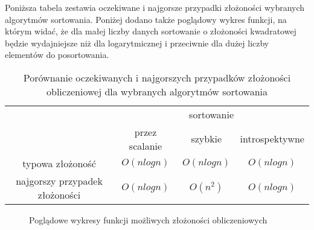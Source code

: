 Poniższa tabela zestawia oczekiwane i najgorsze przypadki złożoności wybranych algorytmów sortowania. Poniżej dodano także poglądowy wykres funkcji, na którym widać, że dla małej liczby danych sortowanie o złożoności kwadratowej będzie wydajniejsze niż dla logarytmicznej i przeciwnie dla dużej liczby elementów do posortowania.

\begin{table}[H]
    \centering
    \caption{Porównanie oczekiwanych i najgorszych przypadków złożoności obliczeniowej dla wybranych algorytmów sortowania}
    \label{tab: opis_zlozonosc}
    \begin{tabular}{c|ccc|}
        \cline{2-4}
        & \multicolumn{3}{c|}{sortowanie}   \\ \cline{2-4} & \multicolumn{1}{c|}{przez scalanie} & \multicolumn{1}{c|}{szybkie} & introspektywne \\ \hline
        \multicolumn{1}{|c|}{typowa złożoność} & \multicolumn{1}{c|}{$O(nlogn)$} & \multicolumn{1}{c|}{$O(nlogn)$} & $O(nlogn)$       \\ \hline
        \multicolumn{1}{|c|}{najgorszy przypadek złożoności} & \multicolumn{1}{c|}{$O(nlogn)$} & \multicolumn{1}{c|}{$O(n^2)$} & $O(nlogn)$       \\ \hline
    \end{tabular}
\end{table}

\begin{figure}[H]
    \centering
    \caption{Poglądowe wykresy funkcji możliwych złożoności obliczeniowych}
    \label{fig: pogladowe_wykresy}
\end{figure}


